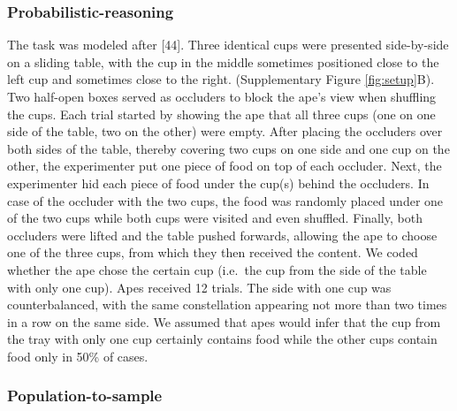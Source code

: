 \documentclass[
  man,floatsintext]{apa6}
\begin{document}
\subsubsection{Probabilistic-reasoning}\label{probabilistic-reasoning}

The task was modeled after {[}44{]}. Three identical cups were presented side-by-side on a sliding table, with the cup in the middle sometimes positioned close to the left cup and sometimes close to the right. (Supplementary Figure \ref{fig:setup}B). Two half-open boxes served as occluders to block the ape's view when shuffling the cups. Each trial started by showing the ape that all three cups (one on one side of the table, two on the other) were empty. After placing the occluders over both sides of the table, thereby covering two cups on one side and one cup on the other, the experimenter put one piece of food on top of each occluder. Next, the experimenter hid each piece of food under the cup(s) behind the occluders. In case of the occluder with the two cups, the food was randomly placed under one of the two cups while both cups were visited and even shuffled. Finally, both occluders were lifted and the table pushed forwards, allowing the ape to choose one of the three cups, from which they then received the content. We coded whether the ape chose the certain cup (i.e.~the cup from the side of the table with only one cup). Apes received 12 trials. The side with one cup was counterbalanced, with the same constellation appearing not more than two times in a row on the same side. We assumed that apes would infer that the cup from the tray with only one cup certainly contains food while the other cups contain food only in 50\% of cases.

\subsubsection{Population-to-sample}\label{population-to-sample}
\end{document}
